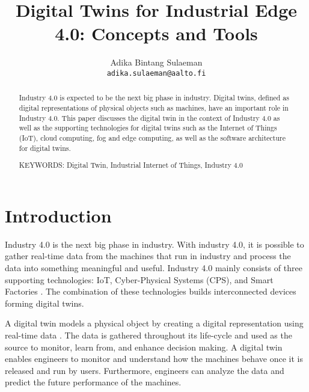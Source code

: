 \documentclass[article]{aaltoseries}
\begin{document}
 

\title{Digital Twins for Industrial Edge 4.0: Concepts and Tools}

\author{Adika Bintang Sulaeman%
\\\textnormal{\texttt{adika.sulaeman@aalto.fi}}} %


\maketitle


\begin{abstract}
  Industry 4.0 is expected to be the next big phase in industry. Digital twins, defined as digital representations of physical objects such as machines, have an important role in Industry 4.0. This paper discusses the digital twin in the context of Industry 4.0 as well as the supporting technologies for digital twins such as the Internet of Things (IoT), cloud computing, fog and edge computing, as well as the software architecture for digital twins.
  
\vspace{3mm}
\noindent KEYWORDS: Digital Twin, Industrial Internet of Things, Industry 4.0

\end{abstract}




\section{Introduction}

Industry 4.0 is the next big phase in industry. With industry 4.0, it is possible to gather real-time data from the machines that run in industry and process the data into something meaningful and useful. Industry 4.0 mainly consists of three supporting technologies: IoT, Cyber-Physical Systems (CPS), and Smart Factories \cite{hermann2016design}. The combination of these technologies builds interconnected devices forming digital twins.

A digital twin models a physical object by creating a digital representation using real-time data \cite{Cheatshe3:online}. The data is gathered throughout its life-cycle and used as the source to monitor, learn from, and enhance decision making. A digital twin enables engineers to monitor and understand how the machines behave once it is released and run by users. Furthermore, engineers can analyze the data and predict the future performance of the machines.
\end{document}
